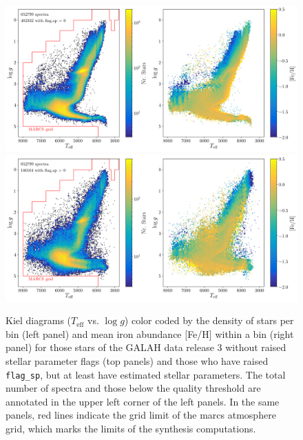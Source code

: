\documentclass[fleqn,usenatbib,useAMS]{mnras}
\begin{document}
\begin{figure}
\centering
\includegraphics[width=\textwidth]{figures/Kiel_Diagram_GALAH_flag_0.png}
\includegraphics[width=\textwidth]{figures/Kiel_Diagram_GALAH_flag_not0.png}
\caption{Kiel diagrams ($T_\text{eff}$ vs. $\log g$) color coded by the density of stars per bin (left panel) and mean iron abundance [Fe/H] within a bin (right panel) for those stars of the GALAH data release 3 without raised stellar parameter flags (top panels) and those who have raised \texttt{flag\_sp}, but at least have estimated stellar parameters. The total number of spectra and those below the quality threshold are annotated in the upper left corner of the left panels. In the same panels, red lines indicate the grid limit of the {\sc marcs} atmosphere grid, which marks the limits of the synthesis computations.}
\label{fig:hrd_galah_dr3}
\end{figure}
\end{document}
